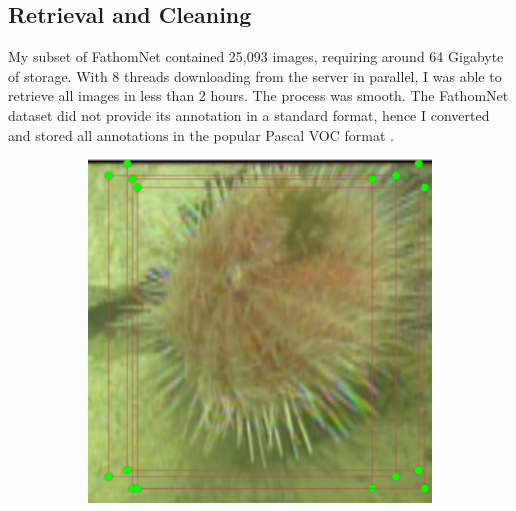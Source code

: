 \documentclass[12pt,a4paper,twoside,openany]{report}
\begin{document}
\subsection{Retrieval and Cleaning}
My subset of FathomNet contained 25,093 images, requiring around 64 Gigabyte of storage. With 8 threads downloading from the server in parallel, I was able to retrieve all images in less than 2 hours. The process was smooth. The FathomNet dataset did not provide its annotation in a standard format, hence I converted and stored all annotations in the popular Pascal VOC format \cite{}.

\begin{figure}[H]
    \begin{subfigure}[b]{0.45\textwidth}
        \centering
        \includegraphics[width=\textwidth]{figs/implementation/fathomnet_problems/duplicate.png}
        \label{fig:fathomnet_duplicate}
    \end{subfigure}
    \hfill
    \begin{subfigure}[b]{0.45\textwidth}
        \centering

\end{subfigure}
\end{figure}
\end{document}
